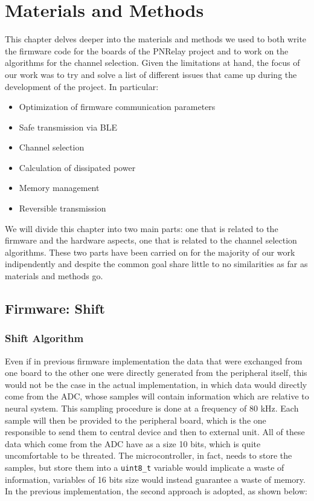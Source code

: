 \documentclass{Configuration_Files/PoliMi3i_thesis}
\begin{document}
\chapter{Materials and Methods}
This chapter delves deeper into the materials and methods we used to both write the firmware code for the boards of the PNRelay project and to work on the algorithms for the channel selection.
Given the limitations at hand, the focus of our work was to try and solve a list of different issues that came up during the development of the project.
In particular:

\begin{itemize}
	\item Optimization of firmware communication parameters
	\item Safe transmission via BLE
	\item Channel selection
	\item Calculation of dissipated power
	\item Memory management
	\item Reversible transmission
\end{itemize}

We will divide this chapter into two main parts: one that is related to the firmware and the hardware aspects, one that is related to the channel selection algorithms.
These two parts have been carried on for the majority of our work indipendently and despite the common goal share little to no similarities as far as materials and methods go.

\section{Firmware: Shift}

\subsection{Shift Algorithm}

Even if in previous firmware implementation the data that were exchanged from one board to the other one were directly generated from the peripheral itself, this would not be the case in the actual implementation, in which data would directly come from the ADC, whose samples will contain information which are relative to neural system. This sampling procedure is done at a frequency of 80 kHz. Each sample will then be provided to the peripheral board, which is the one responsible to send them to central device and then to external unit. All of these data which come from the ADC have as a size 10 bits, which is quite uncomfortable to be threated. The microcontroller, in fact, needs to store the samples, but store them into a \texttt{uint8\_t} variable would implicate a waste of information, variables of 16 bits size would instead guarantee a waste of memory. In the previous implementation, the second approach is adopted, as shown below:
\end{document}

